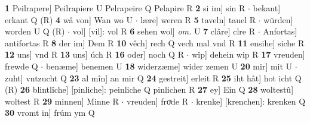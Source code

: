 \documentclass[8pt,a4paper,notitlepage]{article}
\begin{document}
\begin{table}[ht]
\begin{minipage}[t]{0.5\linewidth}
\textbf{1} Peilrapere] Peilrapiere U Pelrapeire Q Pelapire R \textbf{2} si im] sin R  $\cdot$ bekant] erkant Q (R) \textbf{4} wâ von] Wan wo U  $\cdot$ lære] weren R \textbf{5} taveln] tauel R  $\cdot$ würden] worden U Q (R)  $\cdot$ vol] [vil]: vol R \textbf{6} sehen wol] \textit{om.} U \textbf{7} clâre] clre R  $\cdot$ Anfortas] antifortas R \textbf{8} der im] Dem R \textbf{10} vêch] rech Q vech mal vnd R \textbf{11} ensihe] siche R \textbf{12} uns] vnd R \textbf{13} uns] úch R \textbf{16} oder] noch Q R  $\cdot$ wîp] dehein wip R \textbf{17} vreuden] frewde Q  $\cdot$ benæme] benemen U \textbf{18} widerzæme] wider zemen U \textbf{20} mir] mit U  $\cdot$ zuht] vntzucht Q \textbf{23} al mîn] an mir Q \textbf{24} gestreit] erleit R \textbf{25} iht hât] hot icht Q (R) \textbf{26} blintlîche] [pinliche]: peinliche Q pinlichen R \textbf{27} ey] Ein Q \textbf{28} woltestû] woltest R \textbf{29} minnen] Minne R  $\cdot$ vreuden] froͯde R  $\cdot$ krenke] [krenchen]: krenken Q \textbf{30} vromt in] frúm ym Q \newline
\end{minipage}
\end{table}
\end{document}
